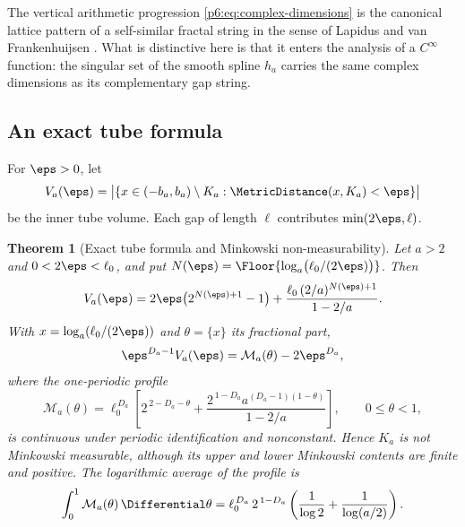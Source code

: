 \documentclass[11pt,oneside]{article}
\numberwithin{equation}{section}
\newtheorem{theorem}{Theorem}[section]
\theoremstyle{definition}
\theoremstyle{remark}
\begin{document}
The vertical arithmetic progression \eqref{p6:eq:complex-dimensions} is the
canonical lattice pattern of a self-similar fractal string in the sense of
Lapidus and van Frankenhuijsen \cite{p6:lapidus-vf}.  What is distinctive here
is that it enters the analysis of a $C^\infty$ function: the singular set of
the smooth spline $h_a$ carries the same complex dimensions as its
complementary gap string.

\subsection{An exact tube formula}

For $\eps>0$, let
\begin{equation}\label{p6:eq:tube-def}
 V_a(\eps)=
 \bigl|\{x\in(-b_a,b_a)\setminus K_a:\MetricDistance(x,K_a)<\eps\}\bigr|
\end{equation}
be the inner tube volume.  Each gap of length $\ell$ contributes
$\min(2\eps,\ell)$.

\begin{theorem}[Exact tube formula and Minkowski non-measurability]
\label{p6:thm:tube-formula}
Let $a>2$ and $0<2\eps<\ell_0$, and put
$N(\eps)=\Floor{\log_a\bigl(\ell_0/(2\eps)\bigr)}$.  Then
\begin{equation}\label{p6:eq:exact-tube}
 V_a(\eps)=2\eps\bigl(2^{N(\eps)+1}-1\bigr)
 +\frac{\ell_0\,(2/a)^{N(\eps)+1}}{1-2/a}.
\end{equation}
With $x=\log_a(\ell_0/(2\eps))$ and $\theta=\{x\}$ its fractional part,
\begin{equation}\label{p6:eq:tube-normalized}
 \eps^{D_a-1}V_a(\eps)
 =\mathcal M_a(\theta)-2\eps^{D_a},
\end{equation}
where the one-periodic profile
\begin{equation}\label{p6:eq:minkowski-profile}
 \mathcal M_a(\theta)=\ell_0^{\,D_a}
 \left[
 2^{\,2-D_a-\theta}
 +\frac{2^{\,1-D_a}a^{(D_a-1)(1-\theta)}}{1-2/a}
 \right],
 \qquad0\le\theta<1,
\end{equation}
is continuous under periodic identification and nonconstant.  Hence $K_a$ is
not Minkowski measurable, although its upper and lower Minkowski contents are
finite and positive.  The logarithmic average of the profile is
\begin{equation}\label{p6:eq:average-minkowski}
 \int_0^1\mathcal M_a(\theta)\,\Differential\theta
 =\ell_0^{\,D_a}\,2^{\,1-D_a}
 \left(\frac1{\log2}+\frac1{\log(a/2)}\right).
\end{equation}
\end{theorem}
\end{document}
